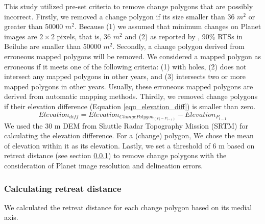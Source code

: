 \documentclass[authoryear,preprint,review,12pt]{elsarticle}
\begin{document}
This study utilized pre-set criteria to remove change polygons that are possibly incorrect. 
Firstly, we removed a change polygon if its size smaller than 36 $m^2$ or greater than 50000 $m^2$. 
Because (1) we assumed that minimum changes on Planet images are $2\times2$ pixels, that is, 36 $m^2$ and (2) as reported by \cite{huang2020using}, 90\% RTSs in Beiluhe are smaller than 50000 $m^2$. 
Secondly, a change polygon derived from erroneous mapped polygons will be removed.
We considered a mapped polygon as erroneous if it meets one of the following criteria: (1) with holes, (2) does not intersect any mapped polygons in other years, and (3) intersects two or more mapped polygons in other years.
Usually, these erroneous mapped polygons are derived from automatic mapping methods. 
Thirdly, we removed change polygons if their elevation difference (Equation \ref{equ_elevation_diff}) is smaller than zero. 
\begin{equation}
Elevation_{diff}=Elevation_{ChangePolygon_{(P_{t}-P_{t-1})}} -  Elevation_{P_{t-1}}
\label{equ_elevation_diff}
\end{equation}
We used the 30 m DEM from Shuttle Radar Topography Mission (SRTM) \citep{farr2007shuttle} for calculating the elevation difference. 
For a (change) polygon, We chose the mean of elevation within it as its elevation. 
Lastly, we set a threshold of 6 m based on retreat distance (see section \ref{sec_cal_retreat_dis}) to remove change polygons with the consideration of Planet image resolution and delineation errors. 


\subsubsection{Calculating retreat distance}
\label{sec_cal_retreat_dis}

We calculated the retreat distance for each change polygon based on its medial axis. 
\end{document}
